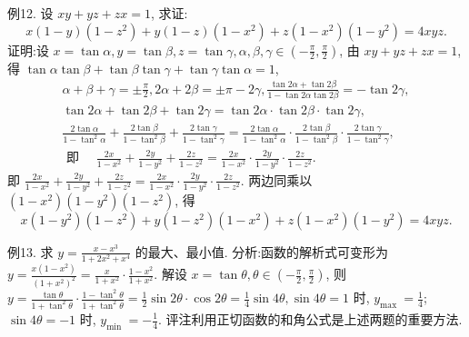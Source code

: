 例12. 设 $x y+y z+z x=1$, 求证:
$$
x(1-y)\left(1-z^2\right)+y(1-z)\left(1-x^2\right)+z\left(1-x^2\right)\left(1-y^2\right)=4 x y z .
$$
证明:设 $x=\tan \alpha, y=\tan \beta, z=\tan \gamma, \alpha, \beta, \gamma \in\left(-\frac{\pi}{2}, \frac{\pi}{2}\right)$, 由 $x y+y z+z x=1$, 得 $\tan \alpha \tan \beta+\tan \beta \tan \gamma+\tan \gamma \tan \alpha=1$,
$$
\begin{gathered}
\alpha+\beta+\gamma= \pm \frac{\pi}{2}, 2 \alpha+2 \beta= \pm \pi-2 \gamma, \frac{\tan 2 \alpha+\tan 2 \beta}{1-\tan 2 \alpha \tan 2 \beta}=-\tan 2 \gamma, \\
\tan 2 \alpha+\tan 2 \beta+\tan 2 \gamma=\tan 2 \alpha \cdot \tan 2 \beta \cdot \tan 2 \gamma, \\
\frac{2 \tan \alpha}{1-\tan ^2 \alpha}+\frac{2 \tan \beta}{1-\tan ^2 \beta}+\frac{2 \tan \gamma}{1-\tan ^2 \gamma}=\frac{2 \tan \alpha}{1-\tan ^2 \alpha} \cdot \frac{2 \tan \beta}{1-\tan ^2 \beta} \cdot \frac{2 \tan \gamma}{1-\tan ^2 \gamma}, \\
\text { 即 } \quad \frac{2 x}{1-x^2}+\frac{2 y}{1-y^2}+\frac{2 z}{1-z^2}=\frac{2 x}{1-x^2} \cdot \frac{2 y}{1-y^2} \cdot \frac{2 z}{1-z^2} .
\end{gathered}
$$
即 $\frac{2 x}{1-x^2}+\frac{2 y}{1-y^2}+\frac{2 z}{1-z^2}=\frac{2 x}{1-x^2} \cdot \frac{2 y}{1-y^2} \cdot \frac{2 z}{1-z^2}$.
两边同乘以 $\left(1-x^2\right)\left(1-y^2\right)\left(1-z^2\right)$, 得
$$
x\left(1-y^2\right)\left(1-z^2\right)+y\left(1-z^2\right)\left(1-x^2\right)+z\left(1-x^2\right)\left(1-y^2\right)=4 x y z .
$$



例13. 求 $y=\frac{x-x^3}{1+2 x^2+x^4}$ 的最大、最小值.
分析:函数的解析式可变形为 $y=\frac{x\left(1-x^2\right)}{\left(1+x^2\right)^2}=\frac{x}{1+x^2} \cdot \frac{1-x^2}{1+x^2}$.
解设 $x=\tan \theta, \theta \in\left(-\frac{\pi}{2}, \frac{\pi}{2}\right)$, 则 $y=\frac{\tan \theta}{1+\tan ^2 \theta} \cdot \frac{1-\tan ^2 \theta}{1+\tan ^2 \theta}= \frac{1}{2} \sin 2 \theta \cdot \cos 2 \theta=\frac{1}{4} \sin 4 \theta, \sin 4 \theta=1$ 时, $y_{\text {max }}=\frac{1}{4}$; $\sin 4 \theta=-1$ 时, $y_{\text {min }}=-\frac{1}{4}$.
评注利用正切函数的和角公式是上述两题的重要方法.



